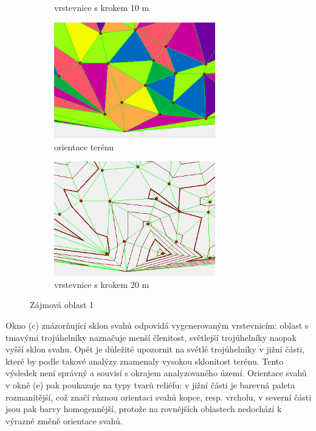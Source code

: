 \begin{figure}[H]
\begin{subfigure}{.475\linewidth}
  \caption{vrstevnice s krokem 10 m}
  \label{MLEDdet}
\end{subfigure}\hfill %
\medskip
\begin{subfigure}{.475\linewidth}
\centering
  \includegraphics[width=7cm]{images/case1a.png}
  \caption{orientace terénu}
  \label{velcomp}
\end{subfigure}\hfill %
\begin{subfigure}{.475\linewidth}
\centering
  \includegraphics[width=7cm]{images/case1m20.png}
  \caption{vrstevnice s krokem 20 m}
  \label{estcomp}
\end{subfigure}

\caption{Zájmová oblast 1}
\label{fig:roc}
\end{figure}

\par Okno (c) znázorňující sklon svahů odpovídá vygenerovaným vrstevnicím: oblast s tmavými trojúhelníky naznačuje menší členitost, světlejší trojúhelníky naopak vyšší sklon svahu. Opět je důležité upozornit na světlé trojúhelníky v jižní části, které by podle takové analýzy znamenaly vysokou sklonitost terénu. Tento výsledek není správný a souvisí s okrajem analyzovaného území. Orientace svahů v okně (e) pak poukazuje na typy tvarů reliéfu: v jižní části je barevná paleta rozmanitější, což značí různou orientaci svahů kopce, resp. vrcholu, v severní části jsou pak barvy homogennější, protože na rovnějších oblastech nedochází k výrazné změně orientace svahů.
\bigbreak

